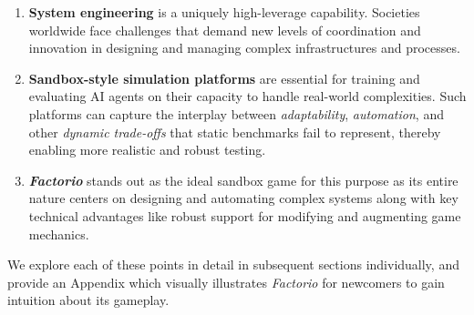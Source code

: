 \begin{enumerate}
    \item \textbf{System engineering} is a uniquely high-leverage capability. Societies worldwide face challenges that demand new levels of coordination and innovation in designing and managing complex infrastructures and processes.

    \item \textbf{Sandbox-style simulation platforms} are essential for training and evaluating AI agents on their capacity to handle real-world complexities. Such platforms can capture the interplay between \emph{adaptability}, \emph{automation}, and other \emph{dynamic trade-offs} that static benchmarks fail to represent, thereby enabling more realistic and robust testing.

    \item \textbf{\textit{Factorio}} stands out as the ideal sandbox game for this purpose as its entire nature centers on designing and automating complex systems along with key technical advantages like robust support for modifying and augmenting game mechanics.
\end{enumerate}

We explore each of these points in detail in subsequent sections individually, and provide an Appendix which visually illustrates \textit{Factorio} for newcomers to gain intuition about its gameplay.
